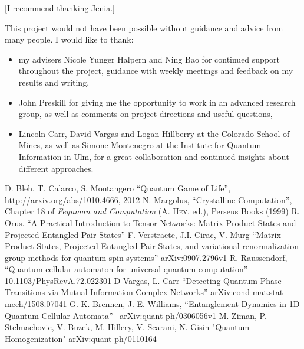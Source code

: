 \documentclass[11pt]{article}
\newcommand{\nicole}[1]{{\color{Green}#1}}
\begin{document}
\begin{multicols}{2}
\nicole{[I recommend thanking Jenia.]}

This project would not have been possible without guidance and advice from many people. I would like to thank:

\begin{itemize}
    \item my advisers Nicole Yunger Halpern and Ning Bao for continued support throughout the project, guidance with weekly meetings and feedback on my results and writing,
    \item John Preskill for giving me the opportunity to work in an advanced research group, as well as comments on project directions and useful questions,
    \item Lincoln Carr, David Vargas and Logan Hillberry at the Colorado School of Mines, as well as Simone Montenegro at the Institute for Quantum Information in Ulm, for a great collaboration and continued insights about different approaches.

\end{itemize}

\begin{thebibliography}{5}
     D. Bleh, T. Calarco, S. Montangero ``Quantum Game of Life'', http://arxiv.org/abs/1010.4666, 2012
     N. Margolus, ``Crystalline Computation'', Chapter 18 of \textit{Feynman and Computation} (\textsc{A. Hey}, ed.), Perseus Books (1999)
     R. Orus. ``A Practical Introduction to Tensor Networks: Matrix Product States and Projected Entangled Pair States''
     F. Verstraete, J.I. Cirac, V. Murg ``Matrix Product States, Projected Entangled Pair States, and variational renormalization group methods for quantum spin systems'' \mbox{arXiv:0907.2796v1}
     R. Raussendorf, ``Quantum cellular automaton for universal quantum computation'' \mbox{10.1103/PhysRevA.72.022301}
     D Vargas, L. Carr ``Detecting Quantum Phase Transitions via Mutual Information Complex Networks'' \mbox{arXiv:cond-mat.stat-mech/1508.07041}
     G. K. Brennen, J. E. Williams, ``Entanglement Dynamics in 1D Quantum Cellular Automata'' \mbox{ arXiv:quant-ph/0306056v1}
     M. Ziman, P. Stelmachovic, V. Buzek, M. Hillery, V. Scarani, N. Gisin "Quantum Homogenization" \mbox{arXiv:quant-ph/0110164}
\end{thebibliography}






\end{multicols}
\end{document}
